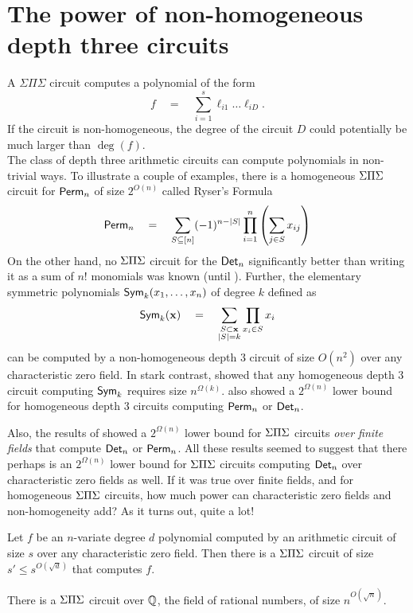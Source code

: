 \chapter{The power of non-homogeneous depth three circuits}

A $\Sigma\Pi\Sigma$ circuit computes a polynomial of the form
\[
f\quad=\quad \sum_{i=1}^s \ell_{i1}\dots \ell_{iD}.
\]
If the circuit is non-homogeneous, the degree of the circuit $D$ could potentially be much larger than $\deg(f)$. \\

The class of depth three arithmetic circuits can compute polynomials
in non-trivial ways.
To illustrate a couple of examples, there is a homogeneous $\Sigma\Pi\Sigma$
circuit for $\operatorname{\mathsf{Perm}}_n$ of size $2^{O(n)}$ called Ryser's Formula
\cite{rys63}
\begin{equation}\label{eqn:ryser}
\operatorname{\mathsf{Perm}}_n \quad = \quad \sum_{S \subseteq[n]} (-1)^{n - |S|} \prod_{i=1}^n \left(\sum_{j\in S} x_{ij}\right)
\end{equation}
On the other hand, no $\Sigma\Pi\Sigma$ circuit for the $\operatorname{\mathsf{Det}}_n$ significantly
better than writing it as a sum of $n!$ monomials was known (until
\cite{gkks13b}). 
Further, the elementary symmetric polynomials $\operatorname{\mathsf{Sym}}_k(x_1,\dots,
x_n)$ of degree $k$ defined as
\[
\operatorname{\mathsf{Sym}}_k(\mathbf{x}) \quad = \quad \sum_{\substack{S\subset \mathbf{x}\\|S| = k}} \prod_{x_i\in S}x_i
\]
can be computed by a non-homogeneous depth $3$ circuit of size
$O(n^2)$ over any characteristic zero field.
In stark contrast, \cite{nw1997} showed that any homogeneous depth $3$
circuit computing $\operatorname{\mathsf{Sym}}_k$ requires size
$n^{\Omega(k)}$. \cite{nw1997} also showed a $2^{\Omega(n)}$ lower
bound for homogeneous depth $3$ circuits computing $\operatorname{\mathsf{Perm}}_n$ or
$\operatorname{\mathsf{Det}}_n$. 

Also, the results of \cite{gr00,grigoriev98} showed a $2^{\Omega(n)}$
lower bound for $\Sigma\Pi\Sigma$ circuits \emph{over finite fields} that compute
$\operatorname{\mathsf{Det}}_n$ or $\operatorname{\mathsf{Perm}}_n$.
All these results seemed to suggest that there perhaps is an
$2^{\Omega(n)}$ lower bound for $\Sigma\Pi\Sigma$ circuits computing $\operatorname{\mathsf{Det}}_n$
over characteristic zero fields as well.
If it was true over finite fields, and for homogeneous $\Sigma\Pi\Sigma$
circuits, how much power can characteristic zero fields and
non-homogeneity add? 
As it turns out, quite a lot!

\begin{theorem} \label{thm:chasm-at-3} Let $f$ be an
  $n$-variate degree $d$ polynomial computed by an arithmetic circuit
  of size $s$ over any characteristic zero field.
  Then there is a $\Sigma\Pi\Sigma$ circuit of size $s' \leq s^{O(\sqrt{d})}$
  that computes $f$. 
\end{theorem}
\begin{corollary}\label{cor:det-sps}
There is a $\Sigma\Pi\Sigma$ circuit over $\mathbb{Q}$, the field of rational numbers, of size $n^{O(\sqrt{n})}$. 
\end{corollary}


